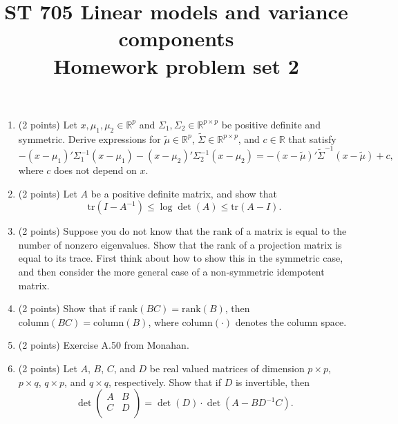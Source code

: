 \documentclass[11pt]{article}
\title{ST 705 Linear models and variance components \\ 
        Homework problem set 2}
\begin{document}
\maketitle

\begin{enumerate}

\item(2 points) Let $x, \mu_{1}, \mu_{2} \in \mathbb{R}^{p}$ and $\Sigma_{1}, \Sigma_{2} \in \mathbb{R}^{p\times p}$ be positive definite and symmetric.  Derive expressions for $\widetilde{\mu} \in \mathbb{R}^{p}$, $\widetilde{\Sigma} \in \mathbb{R}^{p\times p}$, and $c \in \mathbb{R}$ that satisfy
\[
-(x - \mu_{1})'\Sigma_{1}^{-1}(x - \mu_{1}) - (x - \mu_{2})'\Sigma_{2}^{-1}(x - \mu_{2}) = -(x - \widetilde{\mu})'\widetilde{\Sigma}^{-1}(x - \widetilde{\mu}) + c,
\]
where $c$ does not depend on $x$.

\item(2 points) Let $A$ be a positive definite matrix, and show that 
\[
\text{tr}(I - A^{-1}) \le \log\det(A) \le \text{tr}(A - I).
\]

\item(2 points) Suppose you do not know that the rank of a matrix is equal to the number of nonzero eigenvalues.  Show that the rank of a projection matrix is equal to its trace.  First think about how to show this in the symmetric case, and then consider the more general case of a non-symmetric idempotent matrix.

\item(2 points) Show that if $\text{rank}(BC) = \text{rank}(B)$, then $\text{column}(BC) = \text{column}(B)$, where column$(\cdot)$ denotes the column space.

\item(2 points) Exercise A.50 from Monahan.

\item(2 points) Let $A$, $B$, $C$, and $D$ be real valued matrices of dimension $p\times p$, $p\times q$, $q\times p$, and $q\times q$, respectively.  Show that if $D$ is invertible, then
\[
\det
\begin{pmatrix}
A & B \\
C & D \\
\end{pmatrix} = \det(D) \cdot \det(A - BD^{-1}C).
\]


\end{enumerate}
\end{document}
